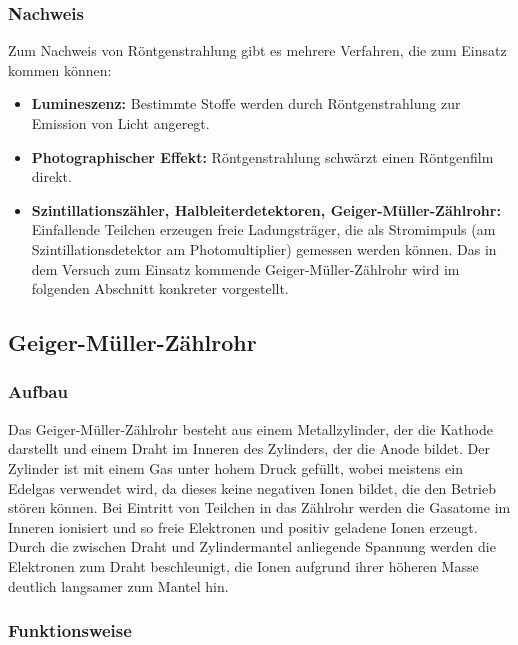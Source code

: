 \documentclass[11pt, a4paper]{article}
\numberwithin{equation}{section}
\begin{document}
\subsubsection{Nachweis}
Zum Nachweis von Röntgenstrahlung gibt es mehrere Verfahren, die zum Einsatz kommen können:
\begin{itemize}
	\item \textbf{Lumineszenz:} Bestimmte Stoffe werden durch Röntgenstrahlung zur Emission von Licht angeregt.
	
	\item \textbf{Photographischer Effekt:} Röntgenstrahlung schwärzt einen Röntgenfilm direkt.
	
	\item \textbf{Szintillationszähler, Halbleiterdetektoren, Geiger-Müller-Zählrohr:} Einfallende Teilchen erzeugen freie Ladungsträger, die als Stromimpuls (am Szintillationsdetektor am Photomultiplier) gemessen werden können. Das in dem Versuch zum Einsatz kommende Geiger-Müller-Zählrohr wird im folgenden Abschnitt konkreter vorgestellt.
\end{itemize}

\subsection{Geiger-Müller-Zählrohr}

\subsubsection{Aufbau}

Das Geiger-Müller-Zählrohr besteht aus einem Metallzylinder, der die Kathode darstellt und einem Draht im Inneren des Zylinders, der die Anode bildet.
Der Zylinder ist mit einem Gas unter hohem Druck gefüllt, wobei meistens ein Edelgas verwendet wird, da dieses keine negativen Ionen bildet, die den Betrieb stören können.
Bei Eintritt von Teilchen in das Zählrohr werden die Gasatome im Inneren ionisiert und so freie Elektronen und positiv geladene Ionen erzeugt.
Durch die zwischen Draht und Zylindermantel anliegende Spannung werden die Elektronen zum Draht beschleunigt, die Ionen aufgrund ihrer höheren Masse deutlich langsamer zum Mantel hin.

\subsubsection{Funktionsweise}
\end{document}
